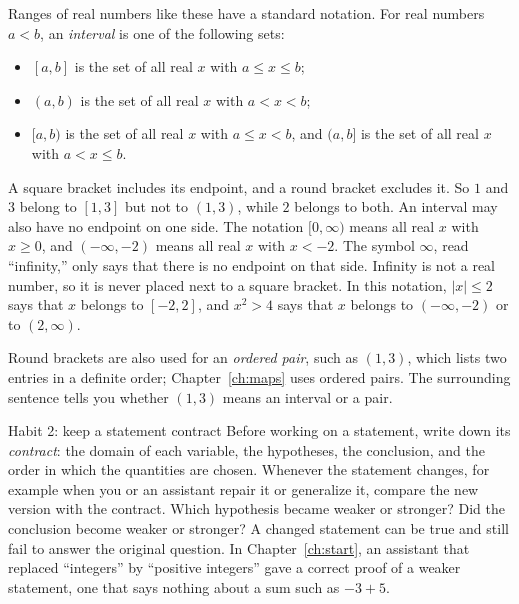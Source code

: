 Ranges of real numbers like these have a standard notation. For real numbers $a<b$, an \emph{interval} is one of the following sets:
\begin{itemize}
\item $[a,b]$ is the set of all real $x$ with $a\le x\le b$;
\item $(a,b)$ is the set of all real $x$ with $a<x<b$;
\item $[a,b)$ is the set of all real $x$ with $a\le x<b$, and $(a,b]$ is the set of all real $x$ with $a<x\le b$.
\end{itemize}
A square bracket includes its endpoint, and a round bracket excludes it. So $1$ and $3$ belong to $[1,3]$ but not to $(1,3)$, while $2$ belongs to both. An interval may also have no endpoint on one side. The notation $[0,\infty)$ means all real $x$ with $x\ge0$, and $(-\infty,-2)$ means all real $x$ with $x<-2$. The symbol $\infty$, read ``infinity,'' only says that there is no endpoint on that side. Infinity is not a real number, so it is never placed next to a square bracket. In this notation, $|x|\le2$ says that $x$ belongs to $[-2,2]$, and $x^2>4$ says that $x$ belongs to $(-\infty,-2)$ or to $(2,\infty)$.

Round brackets are also used for an \emph{ordered pair}, such as $(1,3)$, which lists two entries in a definite order; Chapter~\ref{ch:maps} uses ordered pairs. The surrounding sentence tells you whether $(1,3)$ means an interval or a pair.

\begin{principle}{Habit 2: keep a statement contract}
Before working on a statement, write down its \emph{contract}: the domain of each variable, the hypotheses, the conclusion, and the order in which the quantities are chosen. Whenever the statement changes, for example when you or an assistant repair it or generalize it, compare the new version with the contract. Which hypothesis became weaker or stronger? Did the conclusion become weaker or stronger? A changed statement can be true and still fail to answer the original question. In Chapter~\ref{ch:start}, an assistant that replaced ``integers'' by ``positive integers'' gave a correct proof of a weaker statement, one that says nothing about a sum such as $-3+5$.
\end{principle}
